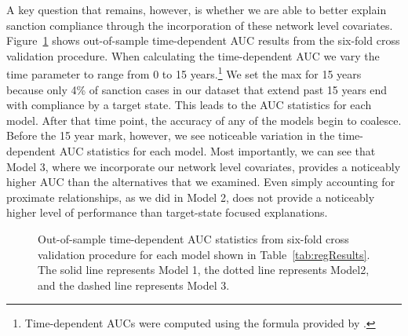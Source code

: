 A key question that remains, however, is whether we are able to better explain sanction compliance through the incorporation of these network level covariates. Figure~\ref{fig:auc} shows out-of-sample time-dependent AUC results from the six-fold cross validation procedure. When calculating the time-dependent AUC we vary the time parameter to range from 0 to 15 years.\footnote{Time-dependent AUCs were computed using the formula provided by \citet{chambless2006estimation}.} We set the max for 15 years because only 4\% of sanction cases in our dataset that extend past 15 years end with compliance by a target state. This leads to the AUC statistics for each model. After that time point, the accuracy of any of the models begin to coalesce. Before the 15 year mark, however, we see noticeable variation in the time-dependent AUC statistics for each model. Most importantly, we can see that Model 3, where we incorporate our network level covariates, provides a noticeably higher AUC than the alternatives that we examined. Even simply accounting for proximate relationships, as we did in Model 2, does not provide a noticeably higher level of performance than target-state focused explanations.

\begin{figure}[ht]
	\centering
	\caption{Out-of-sample time-dependent AUC statistics from six-fold cross validation procedure for each model shown in Table~\ref{tab:regResults}. The solid line represents Model 1, the dotted line represents Model2, and the dashed line represents Model 3.}
	\resizebox{0.8\textwidth}{!}{}
	\label{fig:auc}
\end{figure}